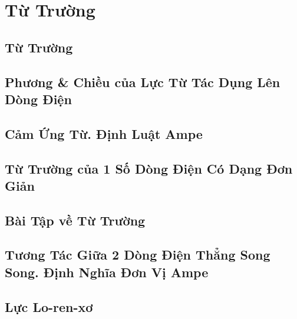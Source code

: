 \documentclass[oneside]{book}
\numberwithin{equation}{section}
\begin{document}
\chapter{Từ Trường}

\section{Từ Trường}


\section{Phương \& Chiều của Lực Từ Tác Dụng Lên Dòng Điện}


\section{Cảm Ứng Từ. Định Luật Ampe}


\section{Từ Trường của 1 Số Dòng Điện Có Dạng Đơn Giản}


\section{Bài Tập về Từ Trường}


\section{Tương Tác Giữa 2 Dòng Điện Thẳng Song Song. Định Nghĩa Đơn Vị Ampe}


\section{Lực Lo-ren-xơ}
\end{document}
